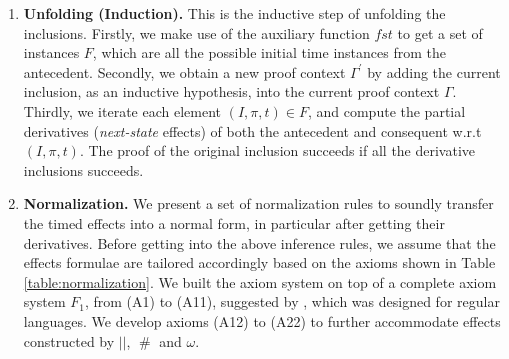\documentclass[acmsmall,10pt,review]{acmart}
\newcommand{\timedEffects}{\emph{TimEffs}}
\newcommand{\effect}{\textcolor{black}{\ensuremath{\mathrm{\Phi}}}}
\newcommand{\choice}{\vee}
\newcommand{\code}[1]{{\tt{\ensuremath{\m{#1}}}}}
\newcommand{\empt}{\textcolor{black}{\ensuremath{\epsilon}}}
\newcommand{\bott}{\textcolor{black}{\ensuremath{\bot}}}
\newcommand{\m}{\mathit}
\newcommand{\mysharp}{{\mathrel{\texttt{\#}}}}
\newcommand\tabref[1]{Table \textcolor{black}{\ref{#1}}.}
\begin{document}
{\begin{enumerate}
\item 
\textbf{Unfolding (Induction).}
\label{unfolding}
This is the inductive step of unfolding the inclusions. Firstly, we make use of the auxiliary function \code{fst} to get a set of instances \code{F}, which are all the possible initial time instances from the antecedent. 
Secondly, we obtain a new proof context \code{\Gamma^\prime} by adding the current inclusion, as an inductive hypothesis, into the current proof context \code{\Gamma}. 
Thirdly, we iterate each element \code{(I, \pi, t) \in F}, and compute the partial derivatives (\emph{next-state} effects) of both the antecedent and consequent w.r.t \code{(I, \pi, t)}. The proof of the original inclusion succeeds if all the derivative inclusions succeeds.



\item 
\textbf{Normalization.}
We present a set of normalization rules to soundly transfer the timed effects into a normal form, in particular after getting their derivatives. 
Before getting into the above inference rules, we assume that the effects formulae are tailored accordingly based on the axioms shown in
\tabref{table:normalization}
We built the axiom system on top of a complete axiom system \code{F_1}, from (A1) to (A11), suggested by \cite{salomaa1966two}, which was designed for regular languages. We develop axioms (A12) to (A22) to further accommodate effects constructed by \code{||},   \code{\mysharp } and \code{\omega}.



% 
%  
%
%
%
%
%
%
%
%
%
% 
%
%
%
% 
% 
%
%
% 
%
%


\end{enumerate}}
\end{document}
